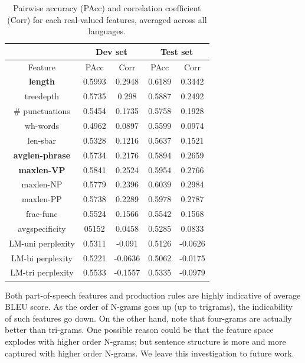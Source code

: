 \documentclass[11pt]{article}
\begin{document}
\begin{table}[ht]
\centering
\begin{small}
\begin{tabular}{c|cc|cc}
& \multicolumn{2}{c|}{Dev set} & \multicolumn{2}{c}{Test set} \\ \hline
Feature & PAcc & Corr & PAcc & Corr \\ \hline \hline
{\bf length} & 0.5993 & 0.2948 & 0.6189 & 0.3442 \\
treedepth & 0.5735 & 0.298 & 0.5887 & 0.2492\\
\# punctuations & 0.5454 & 0.1735 & 0.5758 & 0.1928 \\
wh-words & 0.4962 & 0.0897 & 0.5599 & 0.0974 \\
len-sbar & 0.5328 & 0.1216 & 0.5637 & 0.1521 \\
{\bf avglen-phrase} & 0.5734 & 0.2176 & 0.5894 & 0.2659 \\
{\bf maxlen-VP} & 0.5841 & 0.2524 & 0.5954 & 0.2766 \\
maxlen-NP & 0.5779 & 0.2396 & 0.6039 & 0.2984 \\
maxlen-PP & 0.5738 & 0.2289 & 0.5978 & 0.2787 \\
frac-func & 0.5524 & 0.1566 & 0.5542 & 0.1568 \\
avgspecificity & 05152 & 0.0458 & 0.5285 & 0.0833 \\
LM-uni perplexity & 0.5311 & -0.091 & 0.5126 & -0.0626 \\
LM-bi perplexity& 0.5221 & -0.0636 & 0.5062 & -0.0175 \\
LM-tri perplexity & 0.5533 & -0.1557 & 0.5335 & -0.0979 \\
\end{tabular}
\end{small}
\caption{Pairwise accuracy (PAcc) and correlation coefficient (Corr) for each real-valued features, averaged across all languages.}
\label{tab:indivresults1}
\end{table}

Both part-of-speech features and production rules are highly indicative of average BLEU score. 
As the order of N-grams goes up (up to trigrams), the indicability of such features go down. 
On the other hand, note that four-grams are actually better than tri-grams. One possible reason could be that the feature space explodes with higher order N-grams; but sentence structure is more and more captured with higher order N-grams. We leave this investigation to future work.
\end{document}
